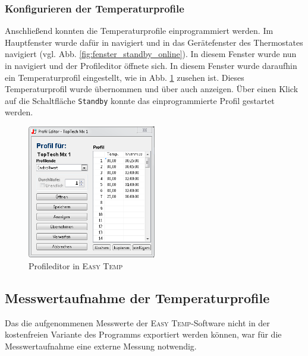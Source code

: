 \subsubsection*{Konfigurieren der Temperaturprofile}
Anschließend konnten die Temperaturprofile einprogrammiert werden. Im Hauptfenster wurde dafür in  navigiert und in das Gerätefenster des Thermostates navigiert (vgl. Abb. \ref{fig:fenster_standby_online}). In diesem Fenster wurde nun in  navigiert und der Profileditor öffnete sich. In diesem Fenster wurde daraufhin ein Temperaturprofil eingestellt, wie in Abb. \ref{fig:tprofil} zusehen ist. Dieses Temperaturprofil wurde übernommen und über  auch anzeigen. Über einen Klick auf die Schaltfläche \texttt{Standby} konnte das einprogrammierte Profil gestartet werden.

\begin{figure}[h!]
	\centering
	\includegraphics[width=0.5\textwidth]{img/julabo_5}
	\caption{Profileditor in \textsc{Easy Temp}}
	\label{fig:tprofil}
\end{figure}
\FloatBarrier


\subsection{Messwertaufnahme der Temperaturprofile}
Das die aufgenommenen Messwerte der \textsc{Easy Temp}-Software nicht in der kostenfreien Variante des Programms exportiert werden können, war für die Messwertaufnahme eine externe Messung notwendig.





